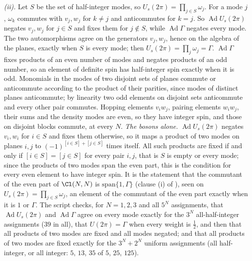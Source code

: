 \emph{(ii).} Let $S$ be the set of half-integer modes, so $U_{s}(2\pi) = \prod_{j \in S}\omega_{j}$. For a mode $j$, $\omega_{k}$ commutes with $v_{j}, w_{j}$ for $k \ne j$ and anticommutes for $k = j$. So $\operatorname{Ad}U_{s}(2\pi)$ negates $v_{j}, w_{j}$ for $j \in S$ and fixes them for $j \notin S$, while $\operatorname{Ad}\Gamma$ negates every mode. The two automorphisms agree on the generators $v_{j}, w_{j}$, hence on the algebra of the planes, exactly when $S$ is every mode; then $U_{s}(2\pi) = \prod_{j}\omega_{j} = \Gamma$. $\operatorname{Ad}\Gamma$ fixes products of an even number of modes and negates products of an odd number, so an element of definite spin has half-integer spin exactly when it is odd. Monomials in the modes of two disjoint sets of planes commute or anticommute according to the product of their parities, since modes of distinct planes anticommute; by linearity two odd elements on disjoint sets anticommute and every other pair commutes. Hopping elements $v_{i}w_{j}$, pairing elements $w_{i}w_{j}$, their sums and the density modes are even, so they have integer spin, and those on disjoint blocks commute, at every $N$. \emph{The bosons alone.} $\operatorname{Ad}U_{s}(2\pi)$ negates $v_{i}, w_{i}$ for $i \in S$ and fixes them otherwise, so it maps a product of two modes on planes $i, j$ to $(-1)^{[i \in S] + [j \in S]}$ times itself. All such products are fixed if and only if $[i \in S] = [j \in S]$ for every pair $i, j$, that is $S$ is empty or every mode; since the products of two modes span the even part, this is the condition for every even element to have integer spin. It is the statement that the commutant of the even part of $\Cl(N,N)$ is $\mathrm{span}\{1, \Gamma\}$ (clause (i) of ), seen on $U_{s}(2\pi) = \prod_{j \in S}\omega_{j}$, an element of the commutant of the even part exactly when it is $1$ or $\Gamma$. The script checks, for $N = 1, 2, 3$ and all $5^{N}$ assignments, that $\operatorname{Ad}U_{s}(2\pi)$ and $\operatorname{Ad}\Gamma$ agree on every mode exactly for the $3^{N}$ all-half-integer assignments ($39$ in all), that $U(2\pi) = \Gamma$ when every weight is $\tfrac12$, and then that all products of two modes are fixed and all modes negated; and that all products of two modes are fixed exactly for the $3^{N} + 2^{N}$ uniform assignments (all half-integer, or all integer: $5$, $13$, $35$ of $5$, $25$, $125$).

